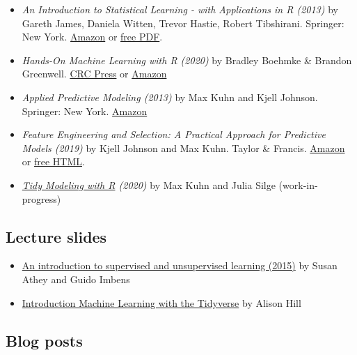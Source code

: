 \documentclass[
]{book}
\begin{document}
\begin{itemize}
\item
  \emph{An Introduction to Statistical Learning - with Applications in R (2013)} by Gareth James, Daniela Witten, Trevor Hastie, Robert Tibshirani. Springer: New York. \href{https://www.amazon.com/Introduction-Statistical-Learning-Applications-Statistics/dp/1461471370}{Amazon} or \href{http://www-bcf.usc.edu/~gareth/ISL/}{free PDF}.
\item
  \emph{Hands-On Machine Learning with R (2020)} by Bradley Boehmke \& Brandon Greenwell. \href{https://www.routledge.com/Hands-On-Machine-Learning-with-R/Boehmke-Greenwell/p/book/9781138495685}{CRC Press} or \href{https://www.amazon.com/gp/product/1138495689?pf_rd_p=ab873d20-a0ca-439b-ac45-cd78f07a84d8\&pf_rd_r=JBRX0ZJ1WFSR9T3JPTQE}{Amazon}
\item
  \emph{Applied Predictive Modeling (2013)} by Max Kuhn and Kjell Johnson. Springer: New York. \href{https://www.amazon.com/Applied-Predictive-Modeling-Max-Kuhn/dp/1461468485?SubscriptionId=0ENGV10E9K9QDNSJ5C82\&tag=apm0a-20\&linkCode=xm2\&camp=2025\&creative=165953\&creativeASIN=1461468485}{Amazon}
\item
  \emph{Feature Engineering and Selection: A Practical Approach for Predictive Models (2019)} by Kjell Johnson and Max Kuhn. Taylor \& Francis. \href{http://www.feat.engineering/}{Amazon} or \href{http://www.feat.engineering/}{free HTML}.
\item
  \emph{\href{https://www.tmwr.org/}{Tidy Modeling with R} (2020)} by Max Kuhn and Julia Silge (work-in-progress)
\end{itemize}

\hypertarget{lecture-slides}{%
\subsection{Lecture slides}\label{lecture-slides}}

\begin{itemize}
\item
  \href{https://www.nber.org/econometrics_minicourse_2015/nber_slides11.pdf}{An introduction to supervised and unsupervised learning (2015)} by Susan Athey and Guido Imbens
\item
  \href{https://education.rstudio.com/blog/2020/02/conf20-intro-ml/}{Introduction Machine Learning with the Tidyverse} by Alison Hill
\end{itemize}

\hypertarget{blog-posts}{%
\subsection{Blog posts}\label{blog-posts}}
\end{document}
